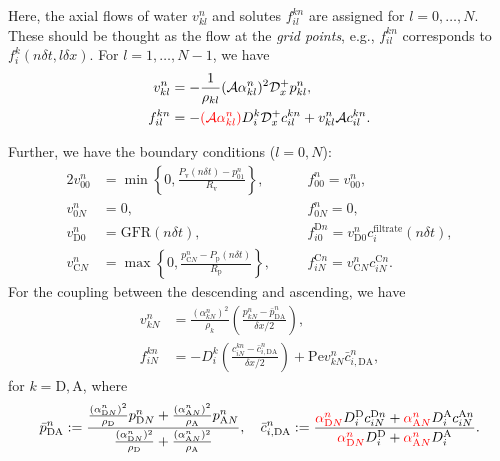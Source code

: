 \documentclass{article}
\begin{document}
Here, the axial flows of water $v_{kl}^n$ and solutes $f_{il}^{kn}$ are assigned for $l=0,\dots,N$.
These should be thought as the flow at the \textit{grid points}, e.g., $f_{il}^{kn}$ corresponds to $f_i^k(n\delta t,l\delta x)$.
For $l=1,\dots,N-1$, we have
\begin{align}
    v_{kl}^n &= -\frac{1}{\rho_{kl}}(\mathcal{A}\alpha_{kl}^n)^2 \mathcal{D}_x^+p_{kl}^n,\\
    f_{il}^{kn} &= -{\color{red}(\mathcal{A}\alpha_{kl}^n)}D_{i}^k \mathcal{D}_x^+ c_{il}^{kn}+ v_{kl}^n \mathcal{A}c_{il}^{kn}.
\end{align}

Further, we have the boundary conditions ($l=0,N$):
\begin{alignat}{2}
    v_{00}^n &= \min\left\{ 0,\frac{P_\mathrm{v}(n\delta t) - p_{01}^n}{R_{\mathrm{v}}} \right\},\quad &&f_{00}^n = v_{00}^n,\\
    v_{0N}^n &= 0,\quad &&f_{0N}^n = 0,\\
    v_{\mathrm{D}0}^n &= \mathrm{GFR}(n\delta t),\quad && f_{i0}^{\mathrm{D}n} = v_{\mathrm{D} 0}^nc_i^\mathrm{filtrate}(n\delta t),\\
    v_{\mathrm{C}N}^n &= \max\left\{ 0,\frac{p_{\mathrm{C}N}^n - P_\mathrm{p}(n\delta t)}{R_\mathrm{p}} \right\},\quad && f_{iN}^{\mathrm{C}n} = v_{\mathrm{C} N}^nc_{iN}^{\mathrm{C}n}.
\end{alignat}
For the coupling between the descending and ascending, we have
\begin{align}
    v_{kN}^n &= \frac{(\alpha_{kN}^n)^2}{\rho_k}\left( \frac{p_{kN}^n - \bar{p}_{\mathrm{DA}}^n}{\delta x/2} \right),\\ 
    f_{iN}^{kn} &= -D_i^k\left( \frac{c_{iN}^{kn} - \bar{c}_{i,\mathrm{DA}}^{n}}{\delta x/2} \right)+\mathrm{Pe}v_{kN}^{n}\bar{c}_{i,\mathrm{DA}}^{n},
\end{align}
    for $k=\mathrm{D},\mathrm{A}$, where
\begin{equation}
    \bar{p}_{\mathrm{DA}}^n:=\frac{\frac{(\alpha_{\mathrm{D}N}^n)^2}{\rho_\mathrm{D}}p_{\mathrm{D}N}^n+\frac{(\alpha_{\mathrm{A}N}^n)^2}{\rho_\mathrm{A}}p_{\mathrm{A}N}^n}{\frac{(\alpha_{\mathrm{D}N}^n)^2}{\rho_\mathrm{D}}+\frac{(\alpha_{\mathrm{A}N}^n)^2}{\rho_\mathrm{A}}},\quad 
    \bar{c}_{i,\mathrm{DA}}^n:=\frac{{\color{red}\alpha_{\mathrm{D}N}^n}D_i^\mathrm{D}c_{iN}^{\mathrm{D}n}+{\color{red}\alpha_{\mathrm{A}N}^n}D_i^\mathrm{A}c_{iN}^{\mathrm{A}n}}{{\color{red}\alpha_{\mathrm{D}N}^n}D_i^\mathrm{D}+{\color{red}\alpha_{\mathrm{A}N}^n}D_i^\mathrm{A}}.
\end{equation}
\end{document}
